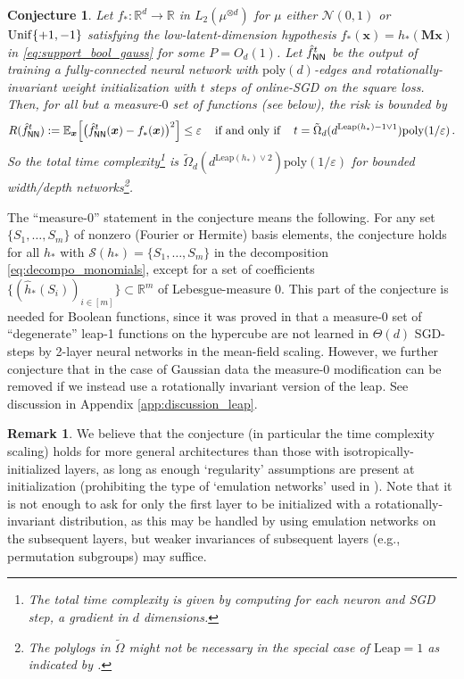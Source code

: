 \documentclass[11pt]{article}
\newcommand{\E}{\mathbb{E}}
\newcommand{\R}{\mathbb{R}}
\newcommand{\eps}{\varepsilon}
\newcommand{\<}{\langle}
\renewcommand{\>}{\rangle}
\newtheorem{conjecture}{Conjecture}
\theoremstyle{definition}
\newtheorem{remark}{Remark}
\def\bM{{\boldsymbol M}}
\def\bx{{\boldsymbol x}}
\def\hf{{\hat f}}
\def\Unif{{\rm Unif}}
\def\cS{{\mathcal S}}
\def\Unif{{\sf Unif}}
\def\NN{{\sf NN}}
\def\Unif{{\sf Unif}}
\def\NN{{\sf NN}}
\def\NN{{\sf NN}}
\def\bx{{\boldsymbol x}}
\def\Unif{{\rm Unif}}
\def\cS{{\mathcal S}}
\def\hf{\hat f}
\def\eps{\varepsilon}
\begin{document}
\begin{conjecture}\label{conj:leap}
Let $f_* : \R^d \to \mathbb{R}$ in $L_2(\mu^{\otimes d})$ for $\mu$ either $\mathcal{N}(0,1)$ or $\Unif\{+1,-1\}$ satisfying the low-latent-dimension hypothesis $f_* (\bx) = h_* ( \bM \bx)$ in \eqref{eq:support_bool_gauss} for some $P=O_d(1)$. 
Let $\hf_{\NN}^{t}$ be the output of training a fully-connected neural network with $\mathrm{poly}(d)$-edges and rotationally-invariant weight initialization with $t$ steps of online-SGD on the square loss. Then, for all but a measure-$0$ set of functions (see below), the risk is bounded by
\begin{align*}
R(\hf_{\NN}^t) := \E_{\bx}\Big[\big(\hf_{\NN}^t(\bx) - f_*(\bx)\big)^2\Big] \le \eps \;\;\; \text{ if and only if } \;\;\; t = \tilde{\Omega}_d ( d^{\mathrm{Leap}(h_*)-1 \vee 1}) \mathrm{poly}(1/\eps)\,.
\end{align*}
So the total time complexity\footnote{The total time complexity is given by computing for each neuron and SGD step, a gradient in $d$ dimensions.} is $\tilde{\Omega}_d ( d^{\mathrm{Leap}(h_*)\vee 2 }) \mathrm{poly}(1/\eps)$ for bounded width/depth networks\footnote{The polylogs in $\tilde{\Omega}$ might not be necessary in the special case of $\mathrm{Leap}=1$ as indicated by \cite{abbe2022merged}.}. \end{conjecture}

The ``measure-0'' statement in the conjecture means the following. For any set $\{S_1,\ldots,S_m\}$ of nonzero (Fourier or Hermite) basis elements, the conjecture holds for all $h_*$ with $\cS (h_*) = \{S_1 , \ldots , S_m\}$ in the decomposition \eqref{eq:decompo_monomials}, except for a set of coefficients $\{ (\hat h_* (S_i ))_{i\in [m]}  \}\subset \R^m$ of Lebesgue-measure $0$. 
This part of the conjecture is needed for Boolean functions, since it was proved in \cite{abbe2022merged} that a measure-$0$ set of ``degenerate'' leap-1 functions on the hypercube are not learned in $\Theta(d)$ SGD-steps by 2-layer neural networks in the mean-field scaling. However, we further conjecture that in the case of Gaussian data the measure-$0$ modification can be removed if we instead use a rotationally invariant version of the leap. See discussion in Appendix \ref{app:discussion_leap}.

\begin{remark}
We believe that the conjecture (in particular the time complexity scaling) holds for more general architectures than those with isotropically-initialized layers, as long as enough `regularity' assumptions are present at initialization (prohibiting the type of `emulation networks' used in \cite{abbe2020universality}). Note that it is not enough to ask for only the first layer to be initialized with a rotationally-invariant distribution, as this may be handled by using emulation networks on the subsequent layers, but weaker invariances of subsequent layers (e.g., permutation subgroups) may suffice.   
\end{remark}
\end{document}
